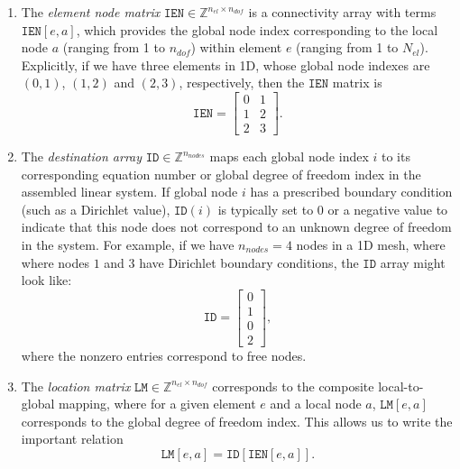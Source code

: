 \begin{enumerate}
    \item The \emph{element node matrix} $\texttt{IEN}\in \mathbb{Z}^{n_{el}\times n_{dof}}$ is a connectivity array with terms $\texttt{IEN}[e, a]$, which provides the global node index corresponding to the local node $a$ (ranging from 1 to $n_{dof}$) within element $e$ (ranging from 1 to $N_{el}$). Explicitly, if we have three elements in 1D, whose global node indexes are $(0,1)$, $(1,2)$ and $(2,3)$, respectively, then the $\texttt{IEN}$ matrix is 
    \begin{equation}
        \texttt{IEN} = \begin{bmatrix}
            0 & 1 \\
            1 & 2 \\
            2 & 3
        \end{bmatrix}.
    \end{equation}
    \item The \emph{destination array} $\texttt{ID}\in \mathbb{Z}^{n_{nodes}}$ maps each global node index $i$ to its corresponding equation number or global degree of freedom index in the assembled linear system. If global node $i$ has a prescribed boundary condition (such as a Dirichlet value), $\texttt{ID}(i)$ is typically set to 0 or a negative value to indicate that this node does not correspond to an unknown degree of freedom in the system. For example, if we have $n_{nodes}=4$ nodes in a 1D mesh, where where nodes $1$ and $3$ have Dirichlet boundary conditions, the $\texttt{ID}$ array might look like:
    \begin{equation}
        \texttt{ID} = \begin{bmatrix}
            0 \\
            1 \\
            0 \\
            2
        \end{bmatrix},
    \end{equation}
    where the nonzero entries correspond to free nodes.
    \item The \emph{location matrix} $\texttt{LM}\in \mathbb{Z}^{n_{el}\times n_{dof}}$ corresponds to the composite local-to-global mapping, where for a given element $e$ and a local node $a$, $\texttt{LM}[e,a]$ corresponds to the global degree of freedom index. This allows us to write the important relation 
    \begin{equation}
        \texttt{LM}[e,a] = \texttt{ID}[\texttt{IEN}[e,a]].
    \end{equation}
\end{enumerate}
